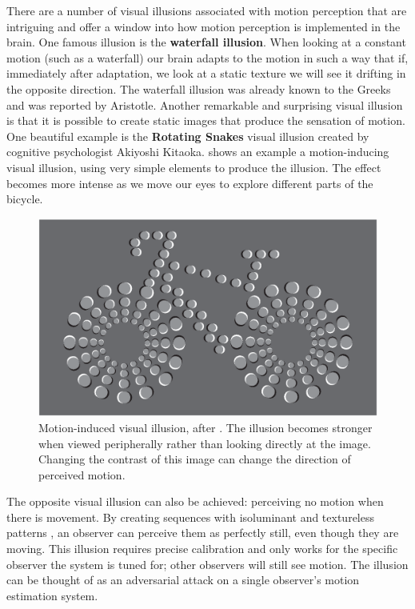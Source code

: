 There are a number of visual illusions associated with motion perception that are intriguing and offer a window into how motion perception is implemented in the brain. One famous illusion is the {\bf waterfall illusion}. When looking at a constant motion (such as a waterfall) our brain adapts to the motion in such a way that if, immediately after adaptation, we look at a static texture we will see it drifting in the opposite direction. The waterfall illusion was already known to the Greeks and was reported by Aristotle. Another remarkable and surprising visual illusion is that it is possible to create static images that produce the sensation of motion. One beautiful example is the {\bf Rotating Snakes} visual illusion created by cognitive psychologist Akiyoshi Kitaoka. \Fig{\ref{fig:motion_illusion}} shows an example a motion-inducing visual illusion, using very simple elements to produce the illusion. The effect becomes more intense as we move our eyes to explore different parts of the bicycle.  



\begin{figure}[t]
\centerline{
\includegraphics[width=1\linewidth]{figures/optical_flow/moving_bike.eps}
}
\caption{Motion-induced visual illusion, after \cite{Murakami2010}. The illusion becomes stronger 
when viewed peripherally rather than looking directly at the image. Changing the contrast of this image can change the direction of perceived motion.}
\label{fig:motion_illusion}
\end{figure}

The opposite visual illusion can also be achieved: perceiving no motion when there is movement. By creating sequences with isoluminant and textureless patterns \cite{Sperling2017}, an observer can perceive them as perfectly still, even though they are moving. This illusion requires precise calibration and only works for the specific observer the system is tuned for; other observers will still see motion. The illusion can be thought of as an adversarial attack on a single observer's motion estimation system.

